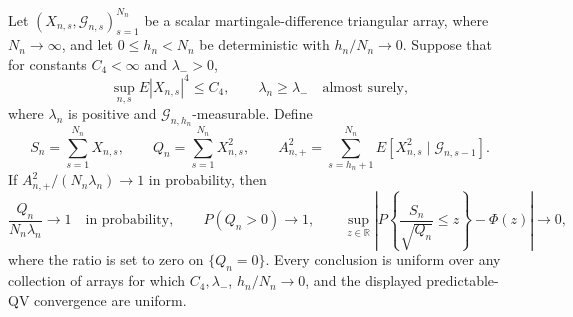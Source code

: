 Let \((X_{n,s},\mathcal G_{n,s})_{s=1}^{N_n}\) be a scalar martingale-difference triangular array, where \(N_n\to\infty\), and let \(0\le h_n<N_n\) be deterministic with \(h_n/N_n\to0\).  Suppose that for constants \(C_4<\infty\) and \(\lambda_->0\),
\[
\sup_{n,s}E|X_{n,s}|^4\le C_4,\qquad
\lambda_n\ge\lambda_-\quad\text{almost surely},
\]
where \(\lambda_n\) is positive and \(\mathcal G_{n,h_n}\)-measurable.  Define
\[
S_n=\sum_{s=1}^{N_n}X_{n,s},\qquad
Q_n=\sum_{s=1}^{N_n}X_{n,s}^2,\qquad
A_{n,+}^2=\sum_{s=h_n+1}^{N_n}E[X_{n,s}^2\mid\mathcal G_{n,s-1}].
\]
If \(A_{n,+}^2/(N_n\lambda_n)\to1\) in probability, then
\[
\frac{Q_n}{N_n\lambda_n}\longrightarrow1\quad\text{in probability},\qquad
P(Q_n>0)\longrightarrow1,\qquad
\sup_{z\in\mathbb R}\left|P\left\{\frac{S_n}{\sqrt{Q_n}}\le z\right\}-\Phi(z)\right|\longrightarrow0,
\]
where the ratio is set to zero on \(\{Q_n=0\}\).  Every conclusion is uniform over any collection of arrays for which \(C_4,\lambda_-\), \(h_n/N_n\to0\), and the displayed predictable-QV convergence are uniform.